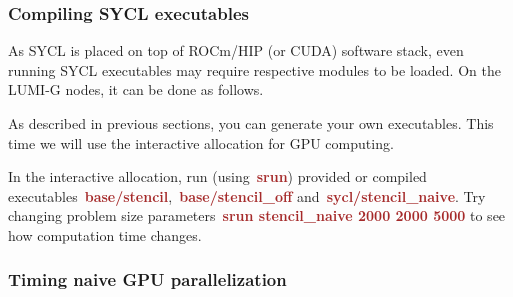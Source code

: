 





\subsubsection{Compiling SYCL executables}


\par
As SYCL is placed on top of ROCm/HIP (or CUDA) software stack, even running SYCL executables may require respective modules to be loaded.
On the LUMI-G nodes, it can be done as follows.



\par
As described in previous sections, you can generate your own executables.
This time we will use the interactive allocation for GPU computing.



\par
In the interactive allocation, run (using~\textbf{\textcolor{brown}{srun}}) provided or compiled executables~\textbf{\textcolor{brown}{base/stencil}},~\textbf{\textcolor{brown}{base/stencil\_off}} and~\textbf{\textcolor{brown}{sycl/stencil\_naive}}.
Try changing problem size parameters~\textbf{\textcolor{brown}{srun stencil\_naive 2000 2000 5000}} to see how computation time changes.


\subsubsection{Timing naive GPU parallelization}


